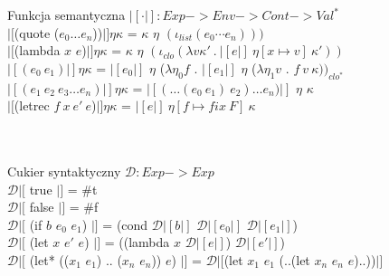 \documentclass[12pt,serif]{beamer}
\begin{document}
\begin{frame}{Funkcja semantyczna}
$|[ \cdot |]: Exp -> Env -> Cont -> Val^{*}$ \newline
\\
$|[$(quote ($e_0 \ldots e_n$))$|] \eta \kappa$ =
  $\kappa$ $\eta$ $(\iota_{list} (e_0 \cdots e_n)))$ \newline
\\
$|[$(lambda $x$ $e$)$|] \eta \kappa$ =
  $\kappa$ $\eta$ $(\iota_{clo} (\lambda v \kappa'~.~ |[e|]~\eta[x \mapsto v]~\kappa' ))$ \newline
\\
$|[(e_0~e_1)|] \eta \kappa$ =
  $|[e_0|]$ $\eta$ ($\lambda \eta_0 f$ .
  $|[e_1|]$ $\eta$ ($\lambda \eta_1 v$ . $f~v~\kappa))_{clo^{*}}$ \newline
\\
$|[(e_1~e_2~e_3 \ldots e_n)|] \eta \kappa$ =
  $|[ (\ldots(e_0~e_1)~e_2) \ldots e_n) |]$ $\eta$ $\kappa$ \newline
\\
$|[$(letrec $f~x~e'~e$)$|] \eta \kappa$ = $|[e|]~\eta[f \mapsto fix~F]~\kappa$ \\
\hspace{1em}{gdzie:} \\
\hspace{2em}{ $F~g~v~\kappa' = |[e'|] ~ \eta[f \mapsto g][x \mapsto v] ~ \kappa' $ } \\
\end{frame}

\begin{frame}{Cukier syntaktyczny}
$\mathcal{D} : Exp -> Exp$ \newline
\\
$\mathcal{D}|[$ true $|]$ = \#t \\
$\mathcal{D}|[$ false $|]$ = \#f \newline
\\
$\mathcal{D}|[$ (if $b$ $e_0$ $e_1$) $|]$ =
   (cond $\mathcal{D}|[ b |]$ $\mathcal{D}|[ e_0 |]$ $\mathcal{D}|[ e_1 |]$) \newline
\\
$\mathcal{D}|[$ (let $x$ $e'$ $e$) $|]$ =
   ((lambda $x$ $\mathcal{D}|[e|]$) $\mathcal{D}|[e'|]$) \\
$\mathcal{D}|[$ (let* (($x_1$ $e_1$) .. ($x_n$ $e_n$)) $e$) $|]$ = 
   $\mathcal{D}|[$(let $x_1$ $e_1$ (..(let $x_n$ $e_n$ $e$)..))$|]$ \\
\end{frame}
\end{document}
